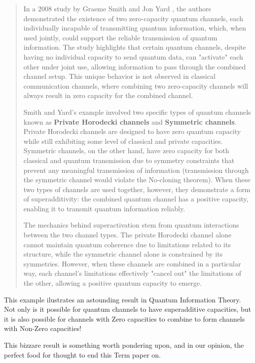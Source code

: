 \begin{quotation}
    In a 2008 study by Graeme Smith and Jon Yard \cite{Smith_2008}, the authors demonstrated
    the existence of two zero-capacity quantum channels, each individually incapable of
    transmitting quantum information, which, when used jointly, could support the reliable
    transmission of quantum information. The study highlights that certain quantum channels,
    despite having no individual capacity to send quantum data, can "activate" each other
    under joint use, allowing information to pass through the combined channel setup. This
    unique behavior is not observed in classical communication channels, where combining
    two zero-capacity channels will always result in zero capacity for the combined
    channel.

    Smith and Yard's example involved two specific types of quantum channels known as
    \textbf{Private Horodecki channels} and \textbf{Symmetric channels}. Private Horodecki
    channels are designed to have zero quantum capacity while still exhibiting some level
    of classical and private capacities. Symmetric channels, on the other hand, have zero
    capacity for both classical and quantum transmission due to symmetry constraints that
    prevent any meaningful transmission of information (transmission through the symmetric
    channel would violate the No-cloning theorem). When these two types of channels are
    used together, however, they demonstrate a form of superadditivity: the combined
    quantum channel has a positive capacity, enabling it to transmit quantum information
    reliably.

    The mechanics behind superactivation stem from quantum interactions between the two
    channel types. The private Horodecki channel alone cannot maintain quantum coherence
    due to limitations related to its structure, while the symmetric channel alone is
    constrained by its symmetries. However, when these channels are combined in a
    particular way, each channel’s limitations effectively "cancel out" the limitations of
    the other, allowing a positive quantum capacity to emerge.
\end{quotation}

This example ilustrates an astounding result in Quantum Information Theory. Not only is
it possible for quantum channels to have superadditive capacities, but it is also possible
for channels with Zero capacities to combine to form channels with Non-Zero capacities!

This bizzare result is something worth pondering upon, and in our opinion, the perfect food
for thought to end this Term paper on.

